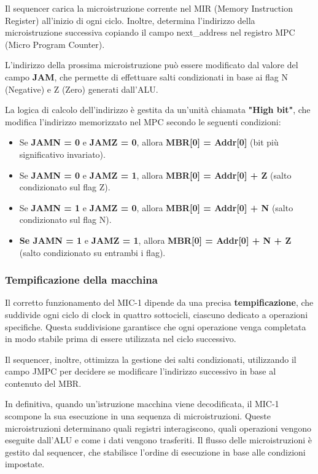 Il sequencer carica la microistruzione corrente nel MIR (Memory Instruction Register) all'inizio di ogni ciclo. Inoltre, determina l'indirizzo della microistruzione successiva copiando il campo next\_address nel registro MPC (Micro Program Counter).

L'indirizzo della prossima microistruzione può essere modificato dal valore del campo \textbf{JAM}, che permette di effettuare salti condizionati in base ai flag N (Negative) e Z (Zero) generati dall'ALU.

La logica di calcolo dell'indirizzo è gestita da un'unità chiamata \textbf{"High bit"}, che modifica l'indirizzo memorizzato nel MPC secondo le seguenti condizioni:
\begin{itemize}
    \item Se \textbf{JAMN = 0} e \textbf{JAMZ = 0}, allora \textbf{MBR[0] = Addr[0]} (bit più significativo invariato).
    \item Se \textbf{JAMN = 0} e \textbf{JAMZ = 1}, allora \textbf{MBR[0] = Addr[0] + Z} (salto condizionato sul flag Z).
    \item Se \textbf{JAMN = 1} e \textbf{JAMZ = 0}, allora \textbf{MBR[0] = Addr[0] + N} (salto condizionato sul flag N).
    \item \textbf{Se JAMN = 1} e \textbf{JAMZ = 1}, allora \textbf{MBR[0] = Addr[0] + N + Z} (salto condizionato su entrambi i flag).
\end{itemize}

\subsubsection*{Tempificazione della macchina}

Il corretto funzionamento del MIC-1 dipende da una precisa \textbf{tempificazione}, che suddivide ogni ciclo di clock in quattro sottocicli, ciascuno dedicato a operazioni specifiche. Questa suddivisione garantisce che ogni operazione venga completata in modo stabile prima di essere utilizzata nel ciclo successivo.

Il sequencer, inoltre, ottimizza la gestione dei salti condizionati, utilizzando il campo JMPC per decidere se modificare l'indirizzo successivo in base al contenuto del MBR.

In definitiva, quando un'istruzione macchina viene decodificata, il MIC-1 scompone la sua esecuzione in una sequenza di microistruzioni. Queste microistruzioni determinano quali registri interagiscono, quali operazioni vengono eseguite dall'ALU e come i dati vengono trasferiti. Il flusso delle microistruzioni è gestito dal sequencer, che stabilisce l'ordine di esecuzione in base alle condizioni impostate.

